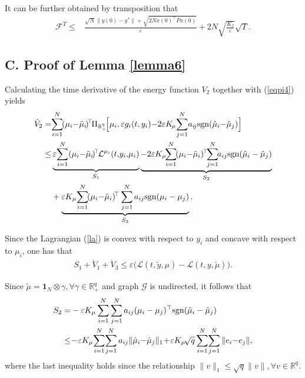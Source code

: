 \documentclass[final,5p,times,twocolumn,authoryear]{elsarticle}
\newcommand{\sign}[1]{\mathrm{sgn}(#1)}
\begin{document}
	It can be further obtained by transposition that
	\begin{align}
		\mathcal{F}^T {\le}& \frac{\sqrt{N}\|y(0){-}y^*\| {+}\sqrt{2N x(0)^{\!\top} \!P\! x(0)}}{\varepsilon}  {+}  2N\sqrt{\frac{K_f}{\varepsilon}}\sqrt{T}.
	\end{align}	
	
	
	\subsection*{{C.} Proof of Lemma \ref{lemma6}}\label{ple6}
	Calculating the time derivative of the energy function $V_2$ together with (\ref{eqpi4}) yields
	\begin{align}
		\dot{V}_{2}
		= 
		&\!\sum_{i=1}^{N} \!(\mu_i{-}\tilde{\mu}_i\!)\!^\top \!\Pi_{\mathbb{R}_+^q}\!\Big[\mu_i,\varepsilon g_i(t,y_i) {-}2\varepsilon K\!_\mu\! \sum_{j=1}^N \!a_{i\!j}\sign{\hat\mu_i{-}\hat\mu_j}\Big] \notag\\
		\le
		& \underbrace{\varepsilon\! \sum_{i=1}^{N} (\mu_i{-}\tilde{\mu}_i\!)\!^\top\! \mathcal{L}^{\mu_i}(t,\!y_i,\!\mu_i)}_{S_{1}}
		 \underbrace{ -2\varepsilon K_\mu\!\! \sum_{i=1}^{N} \!(\mu_i{-}\tilde{\mu}_i)\!^\top\!\! \sum_{j=1}^N \!\!a_{ij}\sign{\hat\mu_i-\hat\mu_j} }_{S_{2}} \notag\\
		&+ \underbrace{ \varepsilon K_\mu \!\sum_{i=1}^{N} \!(\mu_i{-}\tilde{\mu}_i)\!^\top  \sum_{j=1}^N a_{ij}\sign{\mu_i-\mu_j} }_{S_{3}}.	\label{vb1}
	\end{align}
	
	Since the Lagrangian (\ref{la}) is convex with respect to $y_i$ and concave with respect to $\mu_i$, one has that
	\begin{align}
		S_{1}+ \dot{V}_{1} + \dot{V}_{3} \le \varepsilon \Big(\mathcal{L}(t,\tilde{y},\mu) - \mathcal{L}(t,y,\tilde{\mu})\Big).\label{vb2}
	\end{align}
	
	Since $\tilde{\mu}= \boldsymbol1_N \otimes \gamma, \forall \gamma\in \mathbb{R}_+^q$ and graph $\mathcal{G}$ is undirected, it follows that
	\begin{align}
		S_{2}=
		&-\varepsilon K_\mu \sum_{i=1}^{N}  \sum_{j=1}^N a_{ij}(\mu_i-\mu_j)^\top \sign{\hat\mu_i-\hat\mu_j}\notag\\
		\le
		& \!-\!\varepsilon K_\mu \!\sum_{i=1}^{N}\!\sum_{j=1}^N a_{ij} \|\hat\mu_i{-}\hat\mu_j\|_1 \!+\! \varepsilon K_\mu\!\sqrt{q} \sum_{i=1}^{N}  \!\sum_{j=1}^N \|e_i{-}e_j\|,	\label{vb3}
	\end{align}
	where the last inequality holds since the relationship  $\|v\|_1\le\sqrt{q}\|v\|, \forall v\in\mathbb{R}^q$.
	
\end{document}
